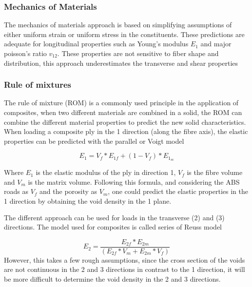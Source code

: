 \subsubsection{Mechanics of Materials}
The mechanics of materials approach is based on simplifying assumptions of either uniform strain or uniform stress in the constituents. These predictions are adequate for longitudinal properties such as Young's modulus $E_1$ and major poisson's ratio $v_{12}$. These properties are not sensitive to fiber shape and distribution, this approach underestimates the transverse and shear properties\cite{Ishai2006EngineeringMaterials}

\subsubsection{Rule of mixtures}
The rule of mixture (ROM) is a commonly used principle in the application of composites, when two different materials are combined in a solid, the ROM can combine the different material properties to predict the new solid characteristics. When loading a composite ply in the 1 direction (along the fibre axis), the elastic properties can be predicted with the parallel or Voigt model\cite{Ishai2006EngineeringMaterials} \cite{Mabessatudelftnl2018MS43025Theory}

\begin{equation} \label{eqn:Voigt}
E_1=V_f*E_{1f}+(1-V_f)*E_1_m
\end{equation}

Where $E_1$ is the elastic modulus of the ply in direction 1, $V_f$ is the fibre volume and $V_m$ is the matrix volume. Following this formula, and considering the ABS roads as $V_f$ and the porosity as $V_m$, one could predict the elastic properties in the 1 direction by obtaining the void density in the 1 plane.

The different approach can be used for loads in the transverse (2) and (3) directions. The model used for composites is called series of Reuss model \cite{Ishai2006EngineeringMaterials} \cite{Mabessatudelftnl2018MS43025Theory}

\begin{equation} \label{eqn:Reuss}
E_2=\frac{E_{2f}*E_{2m}}{(E_{2f}*V_m+E_{2m}*V_f)}
\end{equation}
However, this takes a few rough assumptions, since the cross section of the voids are not continuous in the 2 and 3 directions in contrast to the 1 direction, it will be more difficult to determine the void density in the 2 and 3 directions. 

